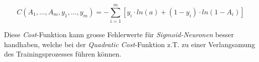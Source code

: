 \begin{equation}\label{eq:cross_enropy_cost}
C(A_1,...,A_m,y_1,...,y_m)=-\sum_{i=1}^{m}\left[ y_i \cdot ln(a) + (1-y_i)\cdot ln(1-A_i)\right]
\end{equation}

Diese \textit{Cost}-Funktion kann grosse Fehlerwerte für \textit{Sigmoid-Neuronen} besser handhaben, welche bei der \textit{Quadratic Cost}-Funktion z.T. zu einer Verlangsamung des Trainingsprozesses führen können.

























